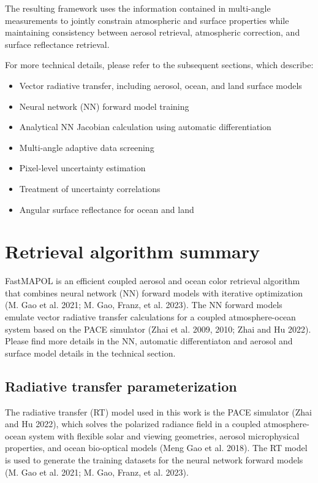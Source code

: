 \documentclass[
  letterpaper,
  open=any]{scrbook}
\providecommand{\tightlist}{%
  \setlength{\itemsep}{0pt}\setlength{\parskip}{0pt}}
\begin{document}
The resulting framework uses the information contained in multi-angle
measurements to jointly constrain atmospheric and surface properties
while maintaining consistency between aerosol retrieval, atmospheric
correction, and surface reflectance retrieval.

For more technical details, please refer to the subsequent sections,
which describe:

\begin{itemize}
\tightlist
\item
  Vector radiative transfer, including aerosol, ocean, and land surface
  models
\item
  Neural network (NN) forward model training
\item
  Analytical NN Jacobian calculation using automatic differentiation
\item
  Multi-angle adaptive data screening
\item
  Pixel-level uncertainty estimation
\item
  Treatment of uncertainty correlations
\item
  Angular surface reflectance for ocean and land
\end{itemize}


\chapter{Retrieval algorithm summary}\label{retrieval-algorithm-summary}

FastMAPOL is an efficient coupled aerosol and ocean color retrieval
algorithm that combines neural network (NN) forward models with
iterative optimization (M. Gao et al. 2021; M. Gao, Franz, et al. 2023).
The NN forward models emulate vector radiative transfer calculations for
a coupled atmosphere-ocean system based on the PACE simulator (Zhai et
al. 2009, 2010; Zhai and Hu 2022). Please find more details in the NN,
automatic differentiaton and aerosol and surface model details in the
technical section.

\section{Radiative transfer
parameterization}\label{radiative-transfer-parameterization}

The radiative transfer (RT) model used in this work is the PACE
simulator (Zhai and Hu 2022), which solves the polarized radiance field
in a coupled atmosphere-ocean system with flexible solar and viewing
geometries, aerosol microphysical properties, and ocean bio-optical
models (Meng Gao et al. 2018). The RT model is used to generate the
training datasets for the neural network forward models (M. Gao et al.
2021; M. Gao, Franz, et al. 2023).
\end{document}
